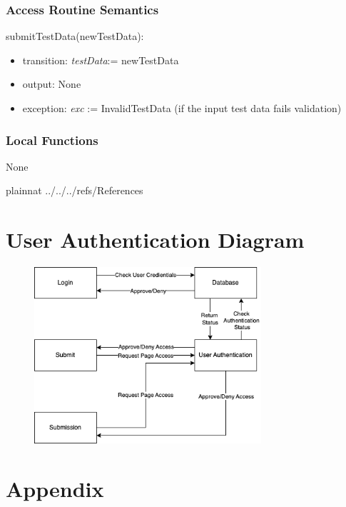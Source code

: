 \documentclass[12pt, titlepage]{article}
\begin{document}
\subsubsection{Access Routine Semantics}

\noindent submitTestData(newTestData):
\begin{itemize}
\item transition: \textit{testData}:= newTestData
\item output: None
\item exception: \textit{exc} := InvalidTestData (if the input test data fails validation)
\end{itemize}

\subsubsection{Local Functions}

None

\newpage


 {plainnat}
 {../../../refs/References}

\newpage

\section{User Authentication Diagram}

\begin{figure}[h]
  \centering
  \includegraphics[width=0.75\textwidth]{Authentication.png}
\end{figure}

\newpage

\section{Appendix} \label{Appendix}
\end{document}
